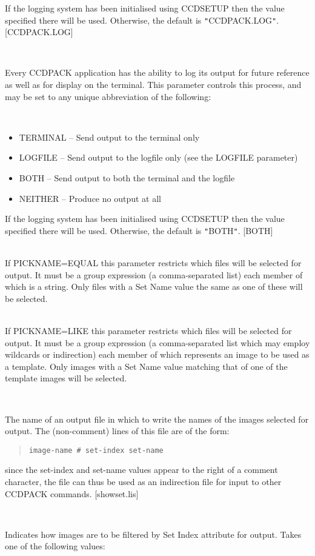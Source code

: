\documentclass[twoside,11pt]{article}
\newcommand{\htmlref}[2]{#1}
\renewcommand{\_}{\texttt{\symbol{95}}}
\newcommand{\xroutine}[1]{\htmlref{{\sc #1}}{#1}}
\newcommand{\sstsubsection}[1]{ \item[{#1}] \mbox{} \\}
\newcommand{\sstitemlist}[1]{
  \mbox{} \\
  \vspace{-3.5ex}
  \begin{itemize}
     #1
  \end{itemize}
}
\newcommand{\sstitem}{\item}
\newcommand{\sstsubsection}[1]{\item[{#1}]}
\newcommand{\sstitemlist}[1]{
      \begin{itemize}
         #1
      \end{itemize}
      \\
   }
\newcommand{\sstitem}{\item}
\begin{document}
{{{         If the logging system has been initialised using \xroutine{CCDSETUP}
         then the value specified there will be used. Otherwise, the
         default is {\tt "}CCDPACK.LOG{\tt "}.
         [CCDPACK.LOG]
      }
      \sstsubsection{
         LOGTO = LITERAL (Read)
      }{
         Every CCDPACK application has the ability to log its output
         for future reference as well as for display on the terminal.
         This parameter controls this process, and may be set to any
         unique abbreviation of the following:
         \sstitemlist{

            \sstitem
               TERMINAL  -- Send output to the terminal only

            \sstitem
               LOGFILE   -- Send output to the logfile only (see the
                               LOGFILE parameter)

            \sstitem
               BOTH      -- Send output to both the terminal and the
                               logfile

            \sstitem
               NEITHER   -- Produce no output at all

         }
         If the logging system has been initialised using \xroutine{CCDSETUP}
         then the value specified there will be used. Otherwise, the
         default is {\tt "}BOTH{\tt "}.
         [BOTH]
      }
      \sstsubsection{
         NAME = LITERAL (Read)
      }{
         If PICKNAME=EQUAL this parameter restricts which files will
         be selected for output.  It must be a group expression
         (a comma-separated list) each member of which is a string.
         Only files with a Set Name value the same as one of these
         will be selected.
      }
      \sstsubsection{
         NAMELIKE = LITERAL (Read)
      }{
         If PICKNAME=LIKE this parameter restricts which files will
         be selected for output.  It must be a group expression
         (a comma-separated list which may employ wildcards or
         indirection) each member of which represents an image to
         be used as a template.  Only images with a Set Name value
         matching that of one of the template images will be selected.
      }
      \sstsubsection{
         NAMELIST = LITERAL (Read)
      }{
         The name of an output file in which to write the names of
         the images selected for output.  The (non-comment) lines of 
         this file are of the form:
         \begin{quote}
            {\tt image-name \# set-index set-name}
         \end{quote}
         since the set-index and set-name values appear to the right
         of a comment character, the file can thus be used as an
         indirection file for input to other CCDPACK commands.
         [showset.lis]
      }
      \sstsubsection{
         PICKINDEX = LITERAL (Read)
      }{
         Indicates how images are to be filtered by Set Index attribute for
         output.  Takes one of the following values:
         \sstitemlist{

}}}}
\end{document}
